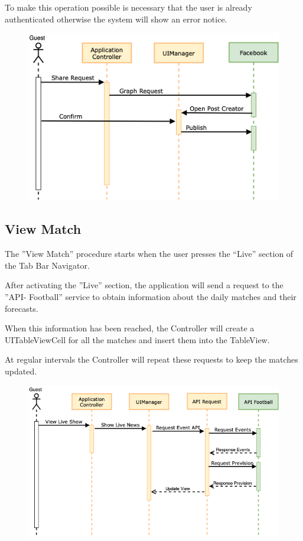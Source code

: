 \documentclass[numbers=noenddot, 12pt, a4paper, oneside]{scrbook}
\begin{document}
To make this operation possible is necessary that the user is already authenticated otherwise the system will show an error notice.


\begin{figure}[H]
	\centering
	\includegraphics[width=1\textwidth]{images/Sequence/SharePost}
\end{figure}


\newpage



\subsection*{View Match}
The ”View Match” procedure starts when the user presses the “Live” section of the Tab Bar Navigator.

After activating the ”Live” section, the application will send a request to the ”API- Football” service to obtain information about the daily matches and their forecasts.

When this information has been reached, the Controller will create a UITableViewCell for all the matches and insert them into the TableView.

At regular intervals the Controller will repeat these requests to keep the matches updated.

\begin{figure}[H]
	\centering
	\includegraphics[width=1\textwidth]{images/Sequence/SequenceLive}
\end{figure}
\end{document}
